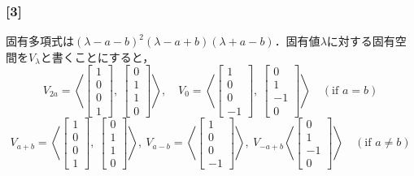 \documentclass[a4j]{ltjsarticle}
\newcommand{\1}{\mathbbm{1}}
\numberwithin{equation}{section}
\theoremstyle{definition}
\begin{document}
\subsubsection*{[3]}
固有多項式は$(\lambda-a-b)^2(\lambda-a+b)(\lambda+a-b)$．固有値$\lambda$に対する固有空間を$V_\lambda$と書くことにすると，
\begin{equation}
    V_{2a}=\left\langle\begin{bmatrix}
        1 \\
        0 \\
        0 \\
        1 
    \end{bmatrix},\ \begin{bmatrix}
        0 \\
        1 \\
        1 \\
        0
    \end{bmatrix}\right\rangle,\quad V_{0}=\left\langle\begin{bmatrix}
        1 \\
        0 \\
        0 \\
        -1 
    \end{bmatrix},\ \begin{bmatrix}
        0 \\
        1 \\
        -1 \\
        0
    \end{bmatrix}\right\rangle\quad (\text{if $a=b$})
\end{equation}
\begin{equation}
    V_{a+b}=\left\langle\begin{bmatrix}
        1 \\
        0 \\
        0 \\
        1 
    \end{bmatrix},\ \begin{bmatrix}
        0 \\
        1 \\
        1 \\
        0
    \end{bmatrix}\right\rangle,\ V_{a-b}=\left\langle\begin{bmatrix}
        1 \\
        0 \\
        0 \\
        -1 
    \end{bmatrix}\right\rangle,\ V_{-a+b}\left\langle\begin{bmatrix}
        0 \\
        1 \\
        -1 \\
        0
    \end{bmatrix}\right\rangle\quad (\text{if $a\neq b$})
\end{equation}
\end{document}
